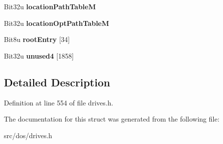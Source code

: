 \begin{DoxyCompactItemize}
\item 
\hypertarget{structisoPVD_ac7c7394e29ebb216df4029953ab6b337}{Bit32u {\bfseries location\-Path\-Table\-M}}\label{structisoPVD_ac7c7394e29ebb216df4029953ab6b337}

\item 
\hypertarget{structisoPVD_a69bb36d8476c0029f6a33b38d1fceb21}{Bit32u {\bfseries location\-Opt\-Path\-Table\-M}}\label{structisoPVD_a69bb36d8476c0029f6a33b38d1fceb21}

\item 
\hypertarget{structisoPVD_ac597b7476c7b1e6573c8ea621c423df8}{Bit8u {\bfseries root\-Entry} \mbox{[}34\mbox{]}}\label{structisoPVD_ac597b7476c7b1e6573c8ea621c423df8}

\item 
\hypertarget{structisoPVD_a78b65797080943af3276b8f142544450}{Bit32u {\bfseries unused4} \mbox{[}1858\mbox{]}}\label{structisoPVD_a78b65797080943af3276b8f142544450}

\end{DoxyCompactItemize}


\subsection{Detailed Description}


Definition at line 554 of file drives.\-h.



The documentation for this struct was generated from the following file\-:\begin{DoxyCompactItemize}
\item 
src/dos/drives.\-h\end{DoxyCompactItemize}
